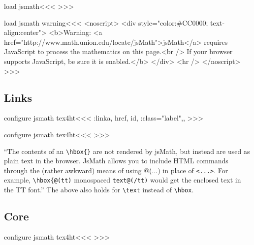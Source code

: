 {{\<load jsmath\><<<
>>>

\<load jsmath warning\><<<
<noscript> \Hnewline
<div style="color:\#CC0000; text-align:center"> \Hnewline
<b>Warning: <a href="http://www.math.union.edu/locate/jsMath">jsMath</a> \Hnewline
requires JavaScript to process the mathematics on this page.<br /> \Hnewline
If your browser supports JavaScript, be sure it is enabled.</b> \Hnewline
</div> \Hnewline
<hr /> \Hnewline
</noscript>\Hnewline
>>>
   


\subsection{Links}




\<configure jsmath tex4ht\><<<
\def\Hbrakets<#1>{\ifmathltx 
       \ifmtext    @(#1)\else \string\hbox{@(#1)}\fi
    \else <#1>\fi}
\def\EndLink{\ifmathltx 
     \ifmtext    |<end mtext space|>%
        \egroup \HCode{\%\Hnewline\%}\Endmtxt:link
        \HCode{\string\end{ref}\Hnewline}|<start mtext space|>%
     \else  \HCode{\Hbrakets</a>}\fi
   \else \expandafter\M:EndLink\fi}
\LinkCommand\msp:link{a, href, id, \mml:class="label",,}
>>>

\<configure jsmath tex4ht\><<<
\def\Link{\M:Link}
\def\EndLink{\M:EndLink}
>>>


``The contents of an \verb=\hbox{}= are not rendered by jsMath, but
instead are used as plain text in the browser.  JsMath allows you to
include HTML commands through the (rather awkward) means of using
@(...) in place of \verb=<...>=.  For example, \verb=\hbox{@(tt)=
  monospaced \verb=text@(/tt)= would get the enclosed text in the TT font.''
The above also holds for \verb=\text= instead of \verb=\hbox=.



\subsection{Core}



\<configure jsmath tex4ht\><<<
   {}
   {\HCode{\string\over\space}}
   {}
   {\HCode{\string\atop\space}}
>>>




}}
